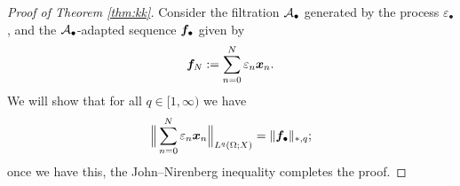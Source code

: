 \begin{proof}[Proof of Theorem \ref{thm:kk}]
  Consider the filtration $\mathcal{A}_{\bullet}$ generated by the process $\varepsilon_{\bullet}$, and the $\mathcal{A}_{\bullet}$-adapted sequence $\bm{f}_{\bullet}$ given by
  \begin{equation*}
    \bm{f}_{N} := \sum_{n=0}^N \varepsilon_n \bm{x}_{n}.
  \end{equation*}
  We will show that for all $q \in [1,\infty)$ we have
  \begin{equation}\label{eq:kk-claim}
    \Big\| \sum_{n=0}^N \varepsilon_n \bm{x}_n \Big\|_{L^q(\Omega;X)} = \|\bm{f}_{\bullet}\|_{*,q};
  \end{equation}
  once we have this, the John--Nirenberg inequality completes the proof.


\end{proof}
